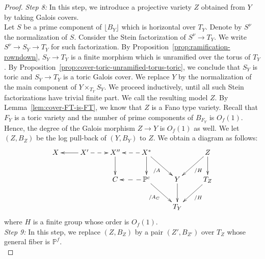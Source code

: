 \documentclass{amsart}
\newcommand{\pp}{\mathbb{P}}
\theoremstyle{remark}
\numberwithin{equation}{section}
\begin{document}
\begin{proof}
\textit{Step 8:}
In this step, we introduce a projective variety $Z$ obtained from $Y$ by taking Galois covers.\\

Let $S$ be a prime component of $\lfloor B_Y\rfloor$ which is horizontal over $T_Y$.
Denote by $S^\nu$ the normalization of $S$. Consider the Stein factorization
of $S^\nu \rightarrow T_Y$.
We write $S^\nu \rightarrow S_Y\rightarrow T_Y$ for such factorization.
By Proposition~\ref{prop:ramification-rowndown}, $S_Y\rightarrow T_Y$ is a finite morphism which is unramified over the torus
of $T_Y$. By Proposition~\ref{prop:cover-toric-unramified-torus-toric},
we conclude that $S_Y$ is toric and $S_Y\rightarrow T_Y$ is a toric Galois cover.
We replace $Y$ by the normalization of the main component of $Y\times_{T_Y}S_Y$.
We proceed inductively, until all such Stein factorizations have trivial finite part.
We call the resulting model $Z$.
By Lemma~\ref{lem:cover-FT-is-FT}, we know that $Z$ is a Fano type variety.
Recall that $F_Y$ is a toric variety
and the number of prime components of $B_{F_Y}$ is $O_f(1)$.
Hence, the degree of the Galois morphism $Z\rightarrow Y$ is $O_f(1)$ as well.
We let $(Z,B_Z)$ be the log pull-back of $(Y,B_Y)$ to $Z$.
We obtain a diagram as follows:
\[
\xymatrix{
X & X'\ar[l]\ar@{-->}[r] &
X''\ar[d]  & X^*\ar@{-->}[l]\ar[d]\ar[rd]_-{/A} & & Z\ar[d]\ar[ld]^-{/H} \\
& & C & \pp^c\ar@{-->}[l]\ar[rd]_-{/A_C} & Y\ar[d] & T_Z\ar[ld]^-{/H} \\
& & & &  T_Y
}
\]
where $H$ is a finite group whose order is $O_f(1)$.\\

\textit{Step 9:} 
In this step, we replace $(Z,B_Z)$ by a pair $(Z',B_{Z'})$ over $T_Z$
whose general fiber is $\pp^f$.\\


\end{proof}
\end{document}
